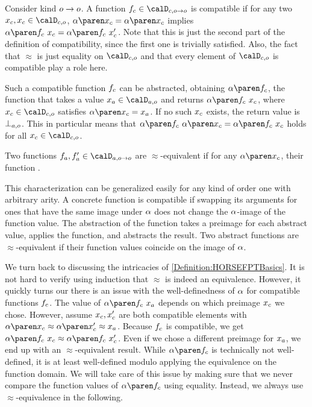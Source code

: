 \documentclass[../../diss.tex]{subfiles}
\begin{document}
\begin{example}%
\label{Example:HORSEFPTBasicDefinitions}%
    Consider kind $o \to o$.
    A function $\fc \in \domainc{\ground \to \ground}$ is compatible if for any two $\xc,\xc \in \domainc{\ground}$, $\abs{\xc} = \abs{\xc}$ implies $\abs{\fc \appl \xc} = \abs{\fc \appl \xc'}$.
    Note that this is just the second part of the definition of compatibility, since the first one is trivially satisfied.
    Also, the fact that $\approx$ is just equality on $\domainc{\ground}$ and that every element of $\domainc{\ground}$ is compatible play a role here.

    Such a compatible function $f_c$ can be abstracted, obtaining $\abs{\fc}$, the function that takes a value $\xa \in \domaina{\ground}$ and returns $\abs{\fc \appl \xc}$, where $\xc \in \domainc{\ground}$ satisfies $\abs{\xc} = \xa$.
    If no such $x_c$ exists, the return value is $\bota{\ground}$.
    This in particular means that $\abs{\fc} \appl \abs{\xc} = \abs{\fc \appl \xc}$ holds for all $\xc \in \domainc{\ground}$.

    Two functions $\fa,\fa' \in \domaina{\ground \to \ground}$ are $\approx$-equivalent if for any $\abs{\xc}$, their function .

    This characterization can be generalized easily for any kind of order one with arbitrary arity.
    A concrete function is compatible if swapping its arguments for ones that have the same image under $\abs$ does not change the $\abs$-image of the function value.
    The abstraction of the function takes a preimage for each abstract value, applies the function, and abstracts the result.
    Two abstract functions are $\approx$-equivalent if their function values coincide on the image of $\abs$.
\end{example}

We turn back to discussing the intricacies of \cref{Definition:HORSEFPTBasics}.
It is not hard to verify using induction that $\approx$ is indeed an equivalence.
However, it quickly turns our there is an issue with the well-definedness of $\abs$ for compatible functions $f_c$.
The value of $\abs{\fc} \appl \xa$ depends on which preimage $x_c$ we chose.
However, assume $x_c, x_c'$ are both compatible elements with $\abs{\xc} \approx \abs{\xc'} \approx \xa$.
Because $f_c$ is compatible, we get $\abs{\fc \appl \xc} \approx \abs{\fc \appl \xc'}$.
Even if we chose a different preimage for $x_a$, we end up with an $\approx$-equivalent result.
While $\abs{\fc}$ is technically not well-defined, it is at least well-defined modulo applying the equivalence on the function domain.
We will take care of this issue by making sure that we never compare the function values of $\abs{\fc}$ using equality.
Instead, we always use $\approx$-equivalence in the following.
\end{document}
